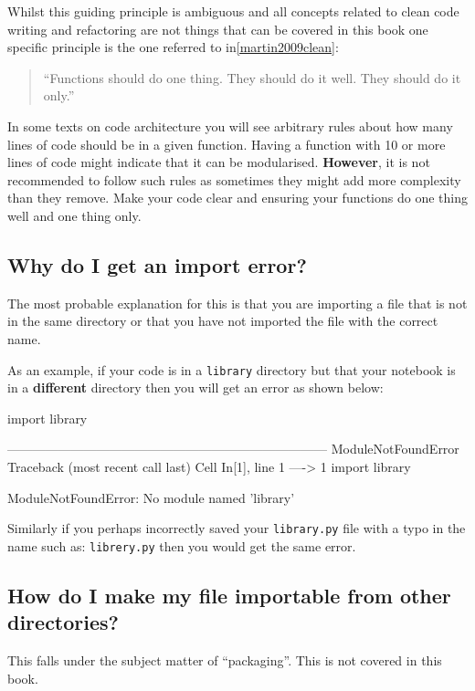 Whilst this guiding principle is ambiguous and all concepts related to clean
code writing and refactoring are not things that can be covered in this book one
specific principle is the one referred to in\ref{martin2009clean}:
\begin{quote}


``Functions should do one thing. They should do it well. They should do it
only.''
\end{quote}



In some texts on code architecture you will see arbitrary rules about how many
lines of code should be in a given function. Having a function with 10 or more
lines of code might indicate that it can be modularised. \textbf{However}, it is
not
recommended to follow such rules as sometimes they might add more complexity than
they remove. Make your code clear and
ensuring your functions do one thing well and one thing only.


\subsection{Why do I get an import error?}
\label{\detokenize{building-tools/05-modularisation/why/main:why-do-i-get-an-import-error}}

The most probable explanation for this is that you are importing a file that is
not in the same directory or that you have not imported the file with the
correct name.


As an example, if your code is in a \texttt{library} directory but that your
notebook is in a \textbf{different} directory then you will get an error as shown
below:





\begin{pyin}
import library
\end{pyin}





\begin{raw}
---------------------------------------------------------------------------
ModuleNotFoundError                       Traceback (most recent call last)
Cell In[1], line 1
----> 1 import library

ModuleNotFoundError: No module named 'library'
\end{raw}






Similarly if you perhaps incorrectly saved your \texttt{library.py} file with a typo in
the name such as: \texttt{librery.py} then you would get the same error.


\subsection{How do I make my file importable from other directories?}
\label{\detokenize{building-tools/05-modularisation/why/main:how-do-i-make-my-file-importable-from-other-directories}}

This falls under the subject matter of ``packaging''. This is not covered in
this book.
